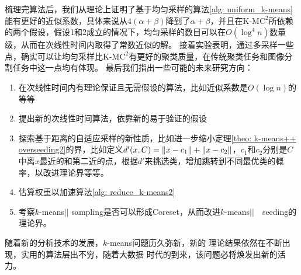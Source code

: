梳理完算法后，我们从理论上证明了基于均匀采样的算法\ref{alg: uniform_k-means}能有更好的近似系数，具体来说从$4(\alpha+\beta)$降到了$\alpha+\beta$，并且在K-M$\text{C}^2$所依赖的两个假设，假设1和2成立的情况下，均匀采样的数目可以在$O(\log^4 n)$数量级，从而在次线性时间内取得了常数近似的解。
接着实验表明，通过多采样一些点，确实可以让均匀采样比K-M$\text{C}^2$有更好的聚类质量，在传统聚类任务和图像分割任务中这一点均有体现。
最后我们指出一些可能的未来研究方向：
\begin{enumerate}
	\item 在次线性时间内有理论保证且无需假设的算法，比如近似系数是$O(\log n)$的等等
	\item 提出新的次线性时间算法，依靠新的易于验证的假设
	\item 探索基于距离的自适应采样的新性质，比如进一步缩小定理\ref{theo: k-means++ overseeding2}的界，比如定义$d'(x,C) = \left\lVert x - c_1\right\rVert+\left\lVert x-c_2\right\rVert$，$c_1$和$c_2$分别是$C$中离$x$最近的和第二近的点，根据$d'$来挑选类，增加跳转到不同最优类的概率，以改进理论界等等。
	\item 估算权重以加速算法\ref{alg: reduce_k-means2}
	\item 考察$k$-means\(\vert \vert\) sampling是否可以形成Coreset，从而改进$k$-means\(\vert \vert\)　seeding的理论界。
\end{enumerate}
随着新的分析技术的发展，$k$-means问题历久弥新，新的
理论结果依然在不断出现，实用的算法层出不穷，随着大数据
时代的到来，该问题必将焕发出新的活力。
